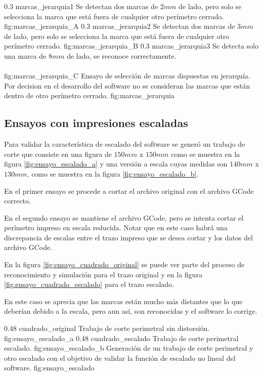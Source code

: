    \subfigabc
   {0.3} {marcas_jerarquia1} {Se detectan dos marcas de $2mm$ de lado, pero solo se selecciona la marca que está fuera de cualquier otro perímetro cerrado.} {fig:marcas_jerarquia_A}
   {0.3} {marcas_jerarquia2} {Se detectan dos marcas de $3mm$ de lado, pero solo se selecciona la marca que está fuera de cualquier otro perímetro cerrado.} {fig:marcas_jerarquia_B}
   {0.3} {marcas_jerarquia3} {Se detecta solo una marca de $8mm$ de lado, se reconoce correctamente.\\ \vphantom{1}\\ \vphantom{1}} {fig:marcas_jerarquia_C}
   {Ensayo de selección de marcas dispuestas en jerarquía. Por decision en el desarrollo del software no se consideran las marcas que están dentro de otro perímetro cerrado.}
   {fig:marcas_jerarquia}

\subsection{Ensayos con impresiones escaladas}

Para validar la característica de escalado del software se generó un trabajo de corte que consiste en una figura de $150mm$ x $150mm$ como se muestra en la figura \ref{fig:ensayo_escalado_a} y una versión a escala cuyas medidas son $140mm$ x $130mm$, como se muestra en la figura \ref{fig:ensayo_escalado_b}.\par
   En el primer ensayo se procede a cortar el archivo original con el archivo GCode correcto. \par
   En el segundo ensayo se mantiene el archivo GCode, pero se intenta cortar el perímetro impreso en escala reducida. Notar que en este caso habrá una discrepancia de escalas entre el trazo impreso que se desea cortar y los datos del archivo GCode.\par
   En la figura \ref{fig:ensayo_cuadrado_original} se puede ver parte del proceso de reconocimiento y simulación para el trazo original y en la figura \ref{fig:ensayo_cuadrado_escalado} para el trazo escalado.\par
   En este caso se aprecia que las marcas están mucho más distantes que lo que deberían debido a la escala, pero aun así, son reconocidas y el software lo corrige.

   \subfigab
   {0.48} {cuadrado_original} {Trabajo de corte perimetral sin distorsión.} {fig:ensayo_escalado_a}
   {0.48} {cuadrado_escalado} {Trabajo de corte perimetral escalado.} {fig:ensayo_escalado_b}
   {Generación de un trabajo de corte perimetral y otro escalado con el objetivo de validar la función de escalado no lineal del software. }
   {fig:ensayo_escalado}

